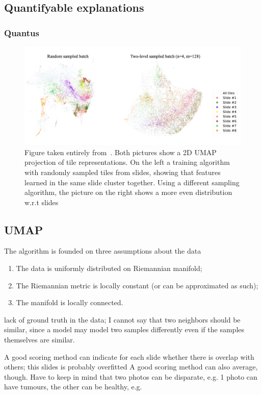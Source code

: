 \documentclass[10pt,twocolumn,letterpaper]{article}
\begin{document}
\subsection{Quantifyable explanations}\label{sec:quantifiable}
\subsubsection{Quantus}


\begin{figure}
  \includegraphics[scale=.17]{./umap.png}
  \caption{Figure taken entirely from~\cite{sslUMAP}. Both pictures show a 2D UMAP projection of tile representations. On the left a training algorithm with randomly sampled tiles from slides, showing that features learned in the same slide cluster together. Using a different sampling algorithm, the picture on the right shows a more even distribution w.r.t slides}
  \label{fig:umap}
\end{figure}

\subsection{UMAP}
 The algorithm is founded on three assumptions about the data
 \begin{enumerate}
   \item The data is uniformly distributed on Riemannian manifold;
   \item The Riemannian metric is locally constant (or can be approximated as such);
   \item The manifold is locally connected.
 \end{enumerate}

lack of ground truth in the data; I cannot say that two neighbors should be similar, since a model may model two samples differently even if the samples themselves are similar.

A good scoring method can indicate for each slide whether there is overlap with others; this slides is probably overfitted
A good scoring method can also average, though.
Have to keep in mind that two photos can be disparate, e.g. 1 photo can have tumours, the other can be healthy, e.g.
\end{document}
